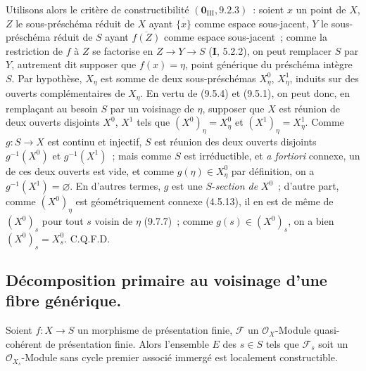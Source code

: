 Utilisons alors le critère de constructibilité $(\mathbf 0_{\mathrm{III}},9.2.3)$~:
soient $x$ un point de $X$, $Z$ le sous-préschéma réduit de $X$ ayant
$\overline{\{x\}}$ comme espace sous-jacent, $Y$ le sous-préschéma réduit de $S$
ayant $\overline{f(Z)}$ comme espace sous-jacent~; comme la restriction de $f$
à $Z$ se factorise en $Z\to Y\to S$ (\textbf{I}, 5.2.2), on peut remplacer $S$
par $Y$, autrement dit supposer que $f(x)=\eta$, point générique du préschéma
intègre $S$. Par hypothèse, $X_\eta$ est somme de deux sous-préschémas
$X_\eta^0$, $X_\eta^1$, induits sur des ouverts complémentaires de $X_\eta$. En
vertu de (9.5.4) et (9.5.1), on peut donc, en remplaçant au besoin $S$ par un
voisinage de $\eta$, supposer que $X$ est réunion de deux ouverts disjoints
$X^0$, $X^1$ tels que $(X^0)_\eta=X_\eta^0$ et $(X^1)_\eta=X_\eta^1$. Comme
$g:S\to X$ est continu et injectif, $S$ est réunion des deux ouverts disjoints
$g^{-1}(X^0)$ et $g^{-1}(X^1)$~; mais comme $S$ est irréductible, et
\emph{a fortiori} connexe, un de ces deux ouverts est vide, et comme
$g(\eta)\in X_\eta^0$ par définition, on a $g^{-1}(X^1)=\varnothing$. En
d'autres termes, $g$ est une $S$-\emph{section de} $X^0$~; d'autre part, comme
$(X^0)_\eta$ est géométriquement connexe (4.5.13), il en est de même de
$(X^0)_s$ pour tout $s$ voisin de $\eta$ (9.7.7)~; comme
$g(s)\in(X^0)_s$, on a bien $(X^0)_s=X_s^0$. C.Q.F.D.

\subsection{Décomposition primaire au voisinage d'une fibre générique.}
\label{subsection:IV.9.8-fr}

\begin{proposition}[9.8.1]
\label{IV.9.8.1-fr}
Soient $f:X\to S$ un morphisme de présentation finie, $\mathcal F$ un
$\mathcal O_X$-Module quasi-cohérent de présentation finie. Alors l'ensemble
$E$ des $s\in S$ tels que $\mathcal F_s$ soit un $\mathcal O_{X_s}$-Module sans
cycle premier associé immergé est localement constructible.
\end{proposition}

